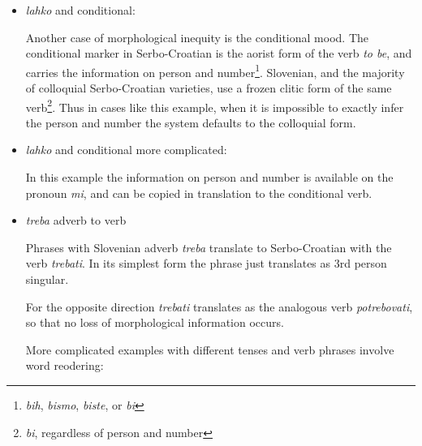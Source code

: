 \begin{itemize}
\item \emph{lahko} and conditional:

Another case of morphological inequity is the conditional
mood. The conditional marker in Serbo-Croatian is the aorist form of the verb
\emph{to be}, and carries the information on person and
number\footnote{\emph{bih}, \emph{bismo}, \emph{biste}, or \emph{bi}}. Slovenian, and the majority of colloquial Serbo-Croatian varieties, use
a frozen clitic form of the same verb\footnote{\emph{bi}, regardless of person and
number}. Thus in cases like this example, when it is impossible to
exactly infer the person and number the system defaults to the
colloquial form.

\item \emph{lahko} and conditional more complicated:

In this example the information on person and number is available
on the pronoun \emph{mi}, and can be copied in translation to the
conditional verb.

\item \emph{treba} adverb to verb

Phrases with Slovenian adverb \emph{treba} translate to Serbo-Croatian with the
verb \emph{trebati}. In its simplest form the phrase just translates
as 3rd person singular.

For the opposite direction \emph{trebati} translates as the analogous
verb \emph{potrebovati}, so that no loss of morphological information occurs.


More complicated examples with different tenses and verb phrases involve word reodering:


\end{itemize}
